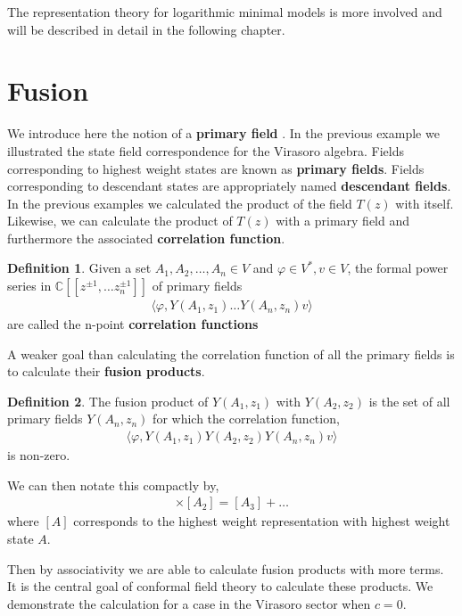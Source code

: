 \documentclass[a4paper,reqno,12pt]{report}
\theoremstyle{definition}
\newtheorem{defn}{Definition}[section]
\newcommand{\C}{\mathbb{C}}
\newcommand{\bra}{\langle}
\newcommand{\ket}{\rangle}
\numberwithin{equation}{section}
\theoremstyle{plain}
\begin{document}
The representation theory for logarithmic minimal models is more involved and will be described in detail in the following chapter.

\section{Fusion}

We introduce here the notion of a {\bf primary field} \cite{MatCFT97}. In the previous example we illustrated the state field correspondence for the Virasoro algebra. Fields corresponding to highest weight states are known as {\bf primary fields}. Fields corresponding to descendant states are appropriately named {\bf descendant fields}.\\

In the previous examples we calculated the product of the field $T(z)$ with itself. Likewise, we can calculate the product of $T(z)$ with a primary field and furthermore the associated {\bf correlation function}.

\begin{defn}
Given a set $A_1, A_2, \dots , A_n \in V$ and $\varphi \in V^*, v\in V$, the formal power series in $\C[[z^{\pm 1}, \dots z_n^{\pm 1}]]$ of primary fields
\begin{align*}
\bra \varphi, Y(A_1, z_1)\dots Y(A_n, z_n)v\ket
\end{align*}
are called the n-point {\bf correlation functions}
\end{defn}

 A weaker goal than calculating the correlation function of all the primary fields is to calculate their {\bf fusion products}. 
 
 \begin{defn}
The fusion product of $Y(A_1,z_1)$ with $Y(A_2,z_2)$ is the set of all primary fields $Y(A_n, z_n)$ for which the correlation function,
\begin{align*}
\bra \varphi, Y(A_1,z_1)Y(A_2,z_2)Y(A_n,z_n) v\ket
\end{align*}
is non-zero. 
\end{defn}

We can then notate this compactly by,
\begin{align*}
[A_1]\times [A_2] = [A_3] + \dots
\end{align*}
where $[A]$ corresponds to the highest weight representation with highest weight state $A$.

Then by associativity we are able to calculate fusion products with more terms. It is the central goal of conformal field theory to calculate these products. We demonstrate the calculation for a case in the Virasoro sector when $c=0$.\\
\end{document}
